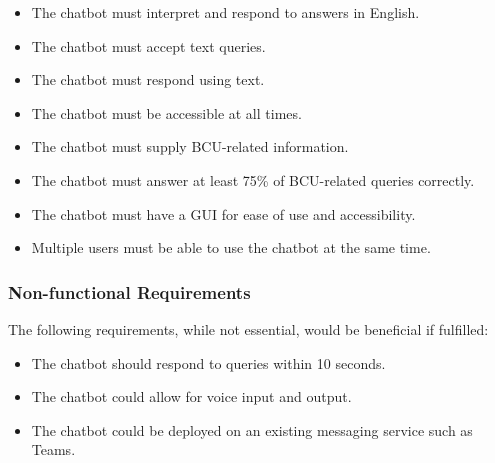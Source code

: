 \begin{itemize}
    \item The chatbot must interpret and respond to answers in English.
    \item The chatbot must accept text queries.
    \item The chatbot must respond using text.
    \item The chatbot must be accessible at all times.
    \item The chatbot must supply BCU-related information.
    \item The chatbot must answer at least 75\% of BCU-related queries correctly.
    \item The chatbot must have a GUI for ease of use and accessibility.
    \item Multiple users must be able to use the chatbot at the same time.
\end{itemize}

\subsubsection{Non-functional Requirements}
The following requirements, while not essential, would be beneficial if fulfilled:

\begin{itemize}
    \item The chatbot should respond to queries within 10 seconds.
    \item The chatbot could allow for voice input and output.
    \item The chatbot could be deployed on an existing messaging service such as Teams.
\end{itemize}



